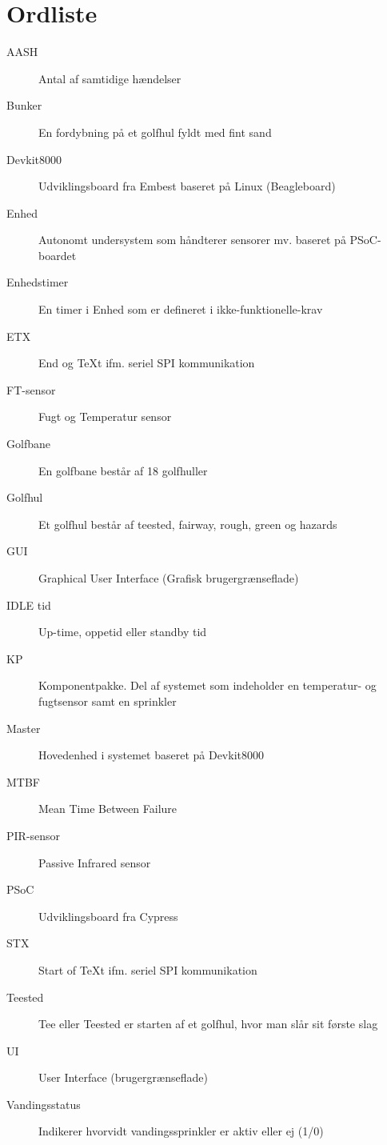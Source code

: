 \chapter{Ordliste}


\begin{description}

\item[AASH] Antal af samtidige hændelser
\item[Bunker] En fordybning på et golfhul fyldt med fint sand
\item[Devkit8000] Udviklingsboard fra Embest baseret på Linux (Beagleboard)
\item[Enhed] Autonomt undersystem som håndterer sensorer mv. baseret på PSoC-boardet
\item[Enhedstimer] En timer i Enhed som er defineret i ikke-funktionelle-krav
\item[ETX] End og TeXt ifm. seriel SPI kommunikation
\item[FT-sensor] Fugt og Temperatur sensor
\item[Golfbane] En golfbane består af 18 golfhuller
\item[Golfhul] Et golfhul består af teested, fairway, rough, green og hazards
\item[GUI] Graphical User Interface (Grafisk brugergrænseflade)
\item[IDLE tid] Up-time, oppetid eller standby tid
\item[KP] Komponentpakke. Del af systemet som indeholder en temperatur- og fugtsensor samt en sprinkler
\item[Master] Hovedenhed i systemet baseret på Devkit8000
\item[MTBF] Mean Time Between Failure
\item[PIR-sensor] Passive Infrared sensor
\item[PSoC] Udviklingsboard fra Cypress
\item[STX] Start of TeXt ifm. seriel SPI kommunikation
\item[Teested] Tee eller Teested er starten af et golfhul, hvor man slår sit første slag
\item[UI] User Interface (brugergrænseflade)
\item[Vandingsstatus] Indikerer hvorvidt vandingssprinkler er aktiv eller ej (1/0)

\end{description}